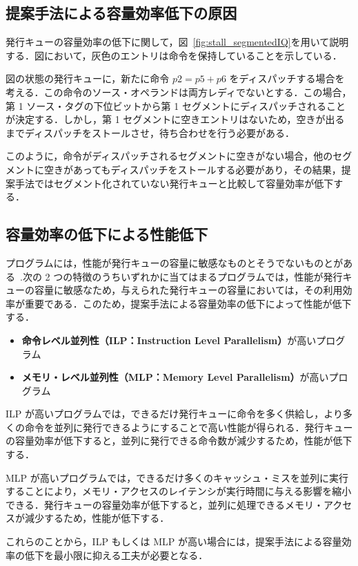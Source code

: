 \documentclass[submit,techrep,noauthor]{ipsj}
\newcommand{\fig}[1]{{図~\ref{fig:#1}}}
\begin{document}
\subsection{提案手法による容量効率低下の原因}
発行キューの容量効率の低下に関して，\fig{stall_segmentedIQ}を用いて説明する．図において，灰色のエントリは命令を保持していることを示している．

図の状態の発行キューに，新たに命令 $p2 = p5 + p6$ をディスパッチする場合を考える．この命令のソース・オペランドは両方レディでないとする．この場合，第 1 ソース・タグの下位ビットから第 1 セグメントにディスパッチされることが決定する．しかし，第 1 セグメントに空きエントリはないため，空きが出るまでディスパッチをストールさせ，待ち合わせを行う必要がある．

このように，命令がディスパッチされるセグメントに空きがない場合，他のセグメントに空きがあってもディスパッチをストールする必要があり，その結果，提案手法ではセグメント化されていない発行キューと比較して容量効率が低下する．

\subsection{容量効率の低下による性能低下}
プログラムには，性能が発行キューの容量に敏感なものとそうでないものとがある~\cite{Ando2019, Kora2013, Sembrant2015}.次の 2 つの特徴のうちいずれかに当てはまるプログラムでは，性能が発行キューの容量に敏感なため，与えられた発行キューの容量においては，その利用効率が重要である．このため，提案手法による容量効率の低下によって性能が低下する．
\begin{itemize}
  \item \textbf{命令レベル並列性（ILP：Instruction Level Parallelism）}が高いプログラム
  \item \textbf{メモリ・レベル並列性（MLP：Memory Level Parallelism）}が高いプログラム 
\end{itemize}

ILP が高いプログラムでは，できるだけ発行キューに命令を多く供給し，より多くの命令を並列に発行できるようにすることで高い性能が得られる．発行キューの容量効率が低下すると，並列に発行できる命令数が減少するため，性能が低下する．

MLP が高いプログラムでは，できるだけ多くのキャッシュ・ミスを並列に実行することにより，メモリ・アクセスのレイテンシが実行時間に与える影響を縮小できる．発行キューの容量効率が低下すると，並列に処理できるメモリ・アクセスが減少するため，性能が低下する．

これらのことから，ILP もしくは MLP が高い場合には，提案手法による容量効率の低下を最小限に抑える工夫が必要となる．
\end{document}
